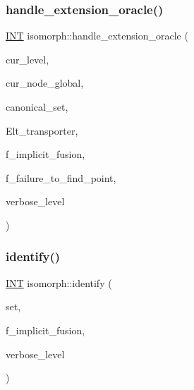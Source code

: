 \subsubsection{\texorpdfstring{handle\+\_\+extension\+\_\+oracle()}{handle\_extension\_oracle()}}
{\footnotesize\ttfamily \mbox{\hyperlink{galois_8h_a09fddde158a3a20bd2dcadb609de11dc}{I\+NT}} isomorph\+::handle\+\_\+extension\+\_\+oracle (\begin{DoxyParamCaption}\item[{\mbox{\hyperlink{galois_8h_a09fddde158a3a20bd2dcadb609de11dc}{I\+NT}}}]{cur\+\_\+level,  }\item[{\mbox{\hyperlink{galois_8h_a09fddde158a3a20bd2dcadb609de11dc}{I\+NT}}}]{cur\+\_\+node\+\_\+global,  }\item[{\mbox{\hyperlink{galois_8h_a09fddde158a3a20bd2dcadb609de11dc}{I\+NT}} $\ast$}]{canonical\+\_\+set,  }\item[{\mbox{\hyperlink{galois_8h_a09fddde158a3a20bd2dcadb609de11dc}{I\+NT}} $\ast$}]{Elt\+\_\+transporter,  }\item[{\mbox{\hyperlink{galois_8h_a09fddde158a3a20bd2dcadb609de11dc}{I\+NT}}}]{f\+\_\+implicit\+\_\+fusion,  }\item[{\mbox{\hyperlink{galois_8h_a09fddde158a3a20bd2dcadb609de11dc}{I\+NT}} \&}]{f\+\_\+failure\+\_\+to\+\_\+find\+\_\+point,  }\item[{\mbox{\hyperlink{galois_8h_a09fddde158a3a20bd2dcadb609de11dc}{I\+NT}}}]{verbose\+\_\+level }\end{DoxyParamCaption})}

\mbox{\label{classisomorph_a78ecf843b9f6ca1cfd666e222edd90ae}} 
\subsubsection{\texorpdfstring{identify()}{identify()}}
{\footnotesize\ttfamily \mbox{\hyperlink{galois_8h_a09fddde158a3a20bd2dcadb609de11dc}{I\+NT}} isomorph\+::identify (\begin{DoxyParamCaption}\item[{\mbox{\hyperlink{galois_8h_a09fddde158a3a20bd2dcadb609de11dc}{I\+NT}} $\ast$}]{set,  }\item[{\mbox{\hyperlink{galois_8h_a09fddde158a3a20bd2dcadb609de11dc}{I\+NT}}}]{f\+\_\+implicit\+\_\+fusion,  }\item[{\mbox{\hyperlink{galois_8h_a09fddde158a3a20bd2dcadb609de11dc}{I\+NT}}}]{verbose\+\_\+level }\end{DoxyParamCaption})}

